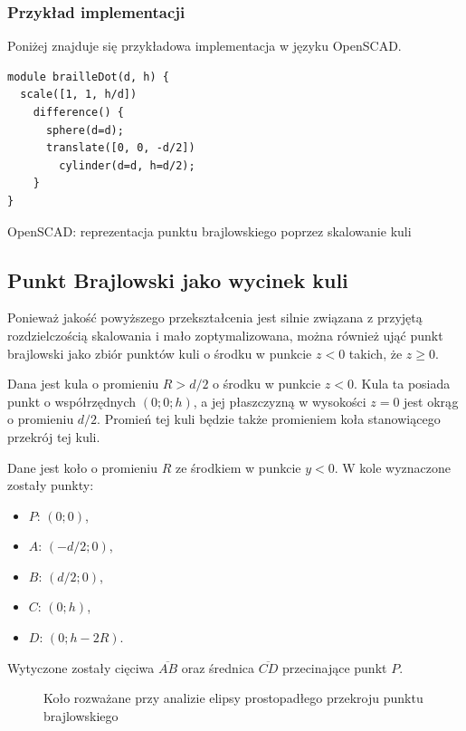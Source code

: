 \documentclass[12pt,a4paper]{article}
\begin{document}
\subsubsection{Przykład implementacji}
Poniżej znajduje się przykładowa implementacja w języku OpenSCAD.

\begin{code}
\begin{verbatim}
module brailleDot(d, h) {
  scale([1, 1, h/d])
    difference() {
      sphere(d=d);
      translate([0, 0, -d/2])
        cylinder(d=d, h=d/2);
    }
}
\end{verbatim}
\caption{OpenSCAD: reprezentacja punktu brajlowskiego poprzez skalowanie kuli}
\end{code}

\subsection{Punkt Brajlowski jako wycinek kuli}
Ponieważ jakość powyższego przekształcenia jest silnie związana z przyjętą rozdzielczością skalowania i mało zoptymalizowana, można również ująć punkt brajlowski jako zbiór punktów kuli o środku w punkcie $z<0$ takich, że $z \geq 0$.

Dana jest kula o promieniu $R>d/2$ o środku w punkcie $z<0$.
Kula ta posiada punkt o współrzędnych $(0;0;h)$, a jej płaszczyzną w wysokości $z=0$ jest okrąg o promieniu $d/2$.
Promień tej kuli będzie także promieniem koła stanowiącego przekrój tej kuli.

Dane jest koło o promieniu $R$ ze środkiem w punkcie $y<0$.
W kole wyznaczone zostały punkty:
\begin{itemize}
\item $P$: $(0; 0)$,
\item $A$: $(-d/2; 0)$,
\item $B$: $(d/2; 0)$,
\item $C$: $(0; h)$,
\item $D$: $(0; h-2R)$.
\end{itemize}

Wytyczone zostały cięciwa $\overline{AB}$ oraz średnica $\overline{CD}$ przecinające punkt $P$.

\begin{figure}
\centering
{}
\caption{Koło rozważane przy analizie elipsy prostopadłego przekroju punktu brajlowskiego}
\end{figure}
\end{document}
